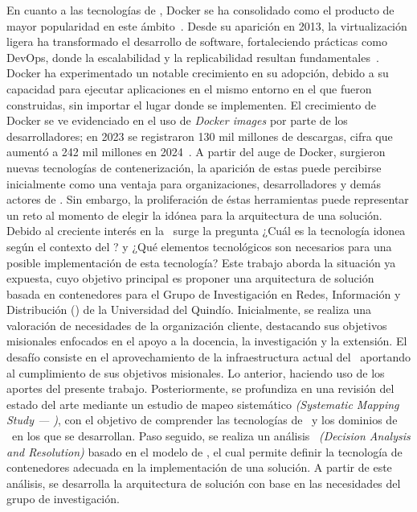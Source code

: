 En cuanto a las tecnologías de \VBC, Docker se ha consolidado como el producto de mayor popularidad en este ámbito~\citep{haque2020challenges}. Desde su aparición en 2013, la virtualización ligera ha transformado el desarrollo de software, fortaleciendo prácticas como DevOps, donde la escalabilidad y la replicabilidad resultan fundamentales~\citep{Docker2021}. Docker ha experimentado un notable crecimiento en su adopción, debido a su capacidad para ejecutar aplicaciones en el mismo entorno en el que fueron construidas, sin importar el lugar donde se implementen. El crecimiento de Docker se ve evidenciado en el uso de \textit{Docker images} por parte de los desarrolladores; en 2023 se registraron 130 mil millones de descargas, cifra que aumentó a 242 mil millones en 2024~\citep{Docker2024}. A partir del auge de Docker, surgieron nuevas tecnologías de contenerización, la aparición de estas puede percibirse inicialmente como una ventaja para organizaciones, desarrolladores y demás actores de \TI. Sin embargo, la proliferación de éstas herramientas puede representar un reto al momento de elegir la idónea para la arquitectura de una solución.\\
Debido al creciente interés en la \VBC\ surge la pregunta ¿Cuál es la tecnología idonea según el contexto del \GRID? y ¿Qué elementos tecnológicos son necesarios para una posible implementación de esta tecnología?  Este trabajo aborda la situación ya expuesta, cuyo objetivo principal es proponer una arquitectura de solución basada en contenedores para el Grupo de Investigación en Redes, Información y Distribución (\GRID) de la Universidad del Quindío. Inicialmente, se realiza una valoración de necesidades de la organización cliente, destacando sus objetivos misionales enfocados en el apoyo a la docencia, la investigación y la extensión. El desafío consiste en el aprovechamiento de la infraestructura actual del \GRID\ aportando al cumplimiento de sus objetivos misionales. Lo anterior, haciendo uso de los aportes del presente trabajo. Posteriormente, se profundiza en una revisión del estado del arte mediante un estudio de mapeo sistemático \textit{(Systematic Mapping Study --- \SMS)}, con el objetivo de comprender las tecnologías de \VBC\ y los dominios de \TI\ en los que se desarrollan. Paso seguido, se realiza un análisis \DAR\ \textit{(Decision Analysis and Resolution)} basado en el modelo de \CMMI, el cual permite definir la tecnología de contenedores adecuada
en la implementación de una solución. A partir de este análisis, se desarrolla la arquitectura de solución con base en las necesidades del grupo de investigación.
